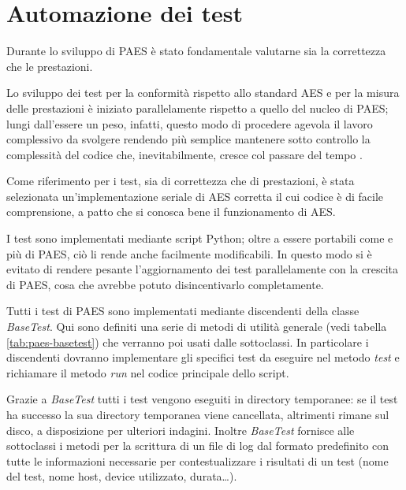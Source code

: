 \documentclass[12pt,a4paper,oneside]{book}
\begin{document}
\section{Automazione dei test}
\label{sec:test}
Durante lo sviluppo di PAES è stato fondamentale valutarne sia la correttezza che le prestazioni.

Lo sviluppo dei test per la conformità rispetto allo standard \ac{AES} e per la misura delle prestazioni è iniziato parallelamente rispetto a quello del nucleo di PAES; lungi dall'essere un peso, infatti, questo modo di procedere agevola il lavoro complessivo da svolgere rendendo più semplice mantenere sotto controllo la complessità del codice che, inevitabilmente, cresce col passare del tempo \cite{bib:test}.

Come riferimento per i test, sia di correttezza che di prestazioni, è stata selezionata un'implementazione seriale di \ac{AES} corretta il cui codice è di facile comprensione, a patto che si conosca bene il funzionamento di \ac{AES}.

I test sono implementati mediante script Python; oltre a essere portabili come e più di PAES, ciò li rende anche facilmente modificabili. In questo modo si è evitato di rendere pesante l'aggiornamento dei test parallelamente con la crescita di PAES, cosa che avrebbe potuto disincentivarlo completamente.

Tutti i test di PAES sono implementati mediante discendenti della classe \textit{BaseTest}. Qui sono definiti una serie di metodi di utilità generale (vedi tabella \ref{tab:paes-basetest}) che verranno poi usati dalle sottoclassi. In particolare i discendenti dovranno implementare gli specifici test da eseguire nel metodo \textit{test} e richiamare il metodo \textit{run} nel codice principale dello script.

Grazie a \textit{BaseTest} tutti i test vengono eseguiti in directory temporanee: se il test ha successo la sua directory temporanea viene cancellata, altrimenti rimane sul disco, a disposizione per ulteriori indagini. Inoltre \textit{BaseTest} fornisce alle sottoclassi i metodi per la scrittura di un file di log dal formato predefinito con tutte le informazioni necessarie per contestualizzare i risultati di un test (nome del test, nome host, device utilizzato, durata\ldots{}).
\end{document}
